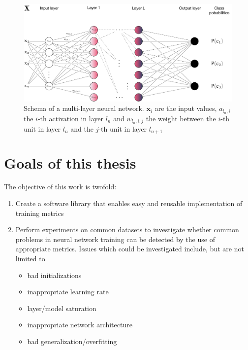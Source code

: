 \begin{figure}
    \hypertarget{fig:neuralnet}{%
        \centering
        \includegraphics[max width=\textwidth]{gfx/diagrams/neural_network/neural_net.pdf}
        \caption[Schema of a multi-layer neural network]{Schema of a multi-layer neural network. \(\mathbf{x}_i\) are
            the input values, \(a_{l_n,i}\) the \(i\)-th activation in layer \(l_n\)
            and \(w_{l_n,i,j}\) the weight between the \(i\)-th unit in layer
        \(l_n\) and the \(j\)-th unit in layer \(l_{n+1}\)}\label{fig:neuralnet}
    }
\end{figure}

\hypertarget{sec:thesis-goals}{%
\section{Goals of this thesis}\label{sec:thesis-goals}}

The objective of this work is twofold:

\begin{enumerate}
    \item
        Create a software library that enables easy and reusable
        implementation of training metrics
    \item
        Perform experiments on common datasets to investigate whether common
        problems in neural network training can be detected by the use of
        appropriate metrics. Issues which could be investigated include, but are
        not limited to
        \begin{itemize}
            \item
                bad initializations
            \item
                inappropriate learning rate
            \item
                layer/model saturation
            \item
                inappropriate network architecture
            \item
                bad generalization/overfitting
        \end{itemize}
\end{enumerate}

